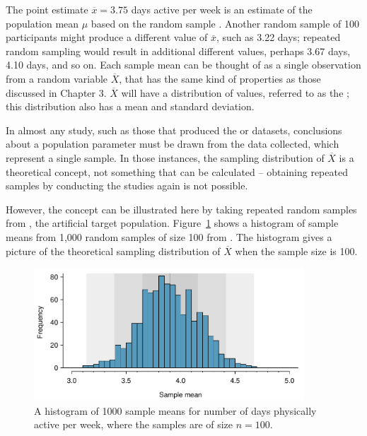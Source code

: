 \begin{spacing}{1.5}
The point estimate $\overline{x} = 3.75$ days active per week is an estimate of the population mean $\mu$ based on the random sample . Another random sample of 100 participants might produce a different value of $\overline{x}$, such as 3.22 days; repeated random sampling would result in additional different values, perhaps 3.67 days, 4.10 days, and so on. Each sample mean can be thought of as a single observation from a random variable $\overline{X}$, that has the same kind of properties as those discussed in Chapter 3. $\overline{X}$ will have a distribution of values, referred to as the ; this distribution also has a mean and standard deviation.

In almost any study, such as those that produced the  or  datasets, conclusions about a population parameter must be drawn from the data collected, which represent a single sample. In those instances, the sampling distribution of $\overline{X}$ is a theoretical concept, not something that can be calculated -- obtaining repeated samples by conducting the studies again is not possible.

However, the concept can be illustrated here by taking repeated random samples from , the artificial target population. Figure~\ref{yrbssActive1000SampDist} shows a histogram of sample means from 1,000 random samples of size 100 from . The histogram gives a picture of the theoretical sampling distribution of $\overline{X}$ when the sample size is 100. 

\begin{figure}[h]
   \centering
   \includegraphics[width=0.9\textwidth]
{ch_inference_foundations_oi_biostat/figures/yrbssActive1000SampDist/yrbssActive1000SampDist}
   \caption{A histogram of 1000 sample means for number of days physically active per week, where the samples are of size $n=100$.}
   \label{yrbssActive1000SampDist}
\end{figure}


\end{spacing}

